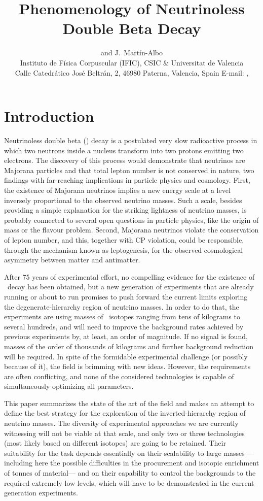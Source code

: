 \documentclass{PoS}
\title{Phenomenology of Neutrinoless Double Beta Decay}
\author{\speaker{J.J.\ G\'omez-Cadenas} and J.\ Mart\'in-Albo \\
Instituto de F\'isica Corpuscular (IFIC), CSIC \& Universitat de Valencia\\
Calle Catedr\'atico Jos\'e Beltr\'an, 2, 46980 Paterna, Valencia, Spain
E-mail: \email{gomez@mail.cern.ch}, \email{jmalbos@ific.uv.es}}
\begin{document}
\section{Introduction}
Neutrinoless double beta (\bbonu) decay is a postulated very slow radioactive process in which two neutrons inside a nucleus transform into two protons emitting two electrons. The discovery of this process would demonstrate that neutrinos are Majorana particles and that total lepton number is not conserved in nature, two findings with far-reaching implications in particle physics and cosmology. First, the existence of Majorana neutrinos implies a new energy scale at a level inversely proportional to the observed neutrino masses. Such a scale, besides providing a simple explanation for the striking lightness of neutrino masses, is probably connected to several open questions in particle physics, like the origin of mass or the flavour problem. Second, Majorana neutrinos violate the conservation of lepton number, and this, together with CP violation, could be responsible, through the mechanism known as leptogenesis, for the observed cosmological asymmetry between matter and antimatter. 

After 75 years of experimental effort, no compelling evidence for the existence of \bbonu\ decay has been obtained, but a new generation of experiments that are already running or about to run promises to push forward the current limits exploring the degenerate-hierarchy region of neutrino masses. In order to do that, the experiments are using masses of \bbonu\ isotopes ranging from tens of kilograms to several hundreds, and will need to improve the background rates achieved by previous experiments by, at least, an order of magnitude. If no signal is found, masses of the order of thousands of kilograms and further background reduction will be required. In spite of the formidable experimental challenge (or possibly because of it), the field is brimming with new ideas. However, the requirements are often conflicting, and none of the considered technologies is capable of simultaneously optimizing all parameters. 

This paper summarizes the state of the art of the field and makes an attempt to define the best strategy for the exploration of the inverted-hierarchy region of neutrino masses. The diversity of experimental approaches we are currently witnessing will not be viable at that scale, and only two or three technologies (most likely based on different isotopes) are going to be retained. Their suitability for the task depends essentially on their scalability to large masses ---\thinspace including here the possible difficulties in the procurement and isotopic enrichment of tonnes of material\thinspace--- and on their capability to control the backgrounds to the required extremely low levels, which will have to be demonstrated in the current-generation experiments.
\end{document}

